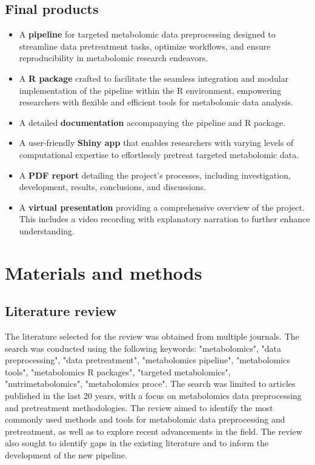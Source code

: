 \documentclass[ENG, BIB]{TFUOC}%
\begin{document}
\section{Final products}
\begin{itemize}
    \item A \textbf{pipeline} for targeted metabolomic data preprocessing designed to streamline data pretreatment tasks, optimize workflows, and ensure reproducibility in metabolomic research endeavors.
    \item A \textbf{R package} crafted to facilitate the seamless integration and modular implementation of the pipeline within the R environment, empowering researchers with flexible and efficient tools for metabolomic data analysis.
    \item A detailed \textbf{documentation} accompanying the pipeline and R package.
    \item A user-friendly \textbf{Shiny app} that enables researchers with varying levels of computational expertise to effortlessly pretreat targeted metabolomic data.
    \item A \textbf{PDF report} detailing the project's processes, including investigation, development, results, conclusions, and discussions.
    \item A \textbf{virtual presentation} providing a comprehensive overview of the project. This includes a video recording with explanatory narration to further enhance understanding.
\end{itemize}


\chapter{Materials and methods} 

\section{Literature review}
The literature selected for the review was obtained from multiple journals. The search was conducted using the following keywords: "metabolomics", "data preprocessing", "data pretreatment", "metabolomics pipeline", "metabolomics tools", "metabolomics R packages", "targeted metabolomics", "nutrimetabolomics", "metabolomics proce". The search was limited to articles published in the last 20 years, with a focus on metabolomics data preprocessing and pretreatment methodologies. The review aimed to identify the most commonly used methods and tools for metabolomic data preprocessing and pretreatment, as well as to explore recent advancements in the field. The review also sought to identify gaps in the existing literature and to inform the development of the new pipeline.
\end{document}
